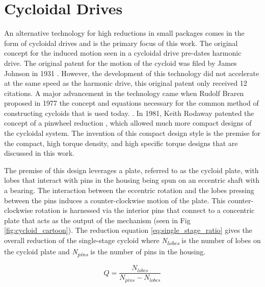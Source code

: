 \section{Cycloidal Drives} \label{intro:cycloid}

An alternative technology for high reductions in small packages comes in the form of cycloidal drives and is the primary focus of this work. The original concept for the induced motion seen in a cycloidal drive pre-dates harmonic drive. The original patent for the motion of the cycloid was filed by James Johnson in 1931 \cite{ref:cycloid_original}. However, the development of this technology did not accelerate at the same speed as the harmonic drive, this original patent only received 12 citations. A major advancement in the technology came when Rudolf Braren proposed in 1977 the concept and equations necessary for the common method of constructing cycloids that is used today. \cite{ref:cycloid_one_stage}. In 1981, Keith Rodaway patented the concept of a pinwheel reduction \cite{ref:cycloid_pinwheel}, which allowed much more compact designs of the cycloidal system. The invention of this compact design style is the premise for the compact, high torque density, and high specific torque designs that are discussed in this work.

The premise of this design leverages a plate, referred to as the cycloid plate, with lobes that interact with pins in the housing being spun on an eccentric shaft with a bearing.
The interaction between the eccentric rotation and the lobes pressing between the pins induces a counter-clockwise motion of the plate. This counter-clockwise rotation is harnessed via the interior pins that connect to a concentric plate that acts as the output of the mechanism (seen in Fig \ref{fig:cycloid_cartoon}). The reduction equation \ref{eq:single_stage_ratio} gives the overall reduction of the single-stage cycloid where \textit{N\textsubscript{lobes}} is the number of lobes on the cycloid plate and \textit{N\textsubscript{pins}} is the number of pins in the housing. 

\begin{equation} \label{eq:single_stage_ratio}
Q = \frac{N_{lobes}} {N_{pins} - N_{lobes}}
\end{equation}

